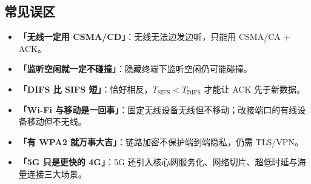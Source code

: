 \subsection{常见误区}

\begin{itemize}
    \item \textbf{「无线一定用 CSMA/CD」}：无线无法边发边听，只能用 CSMA/CA + ACK。
    \item \textbf{「监听空闲就一定不碰撞」}：隐藏终端下监听空闲仍可能碰撞。
    \item \textbf{「DIFS 比 SIFS 短」}：恰好相反，$T_{\text{SIFS}}<T_{\text{DIFS}}$ 才能让 ACK 先于新数据。
    \item \textbf{「Wi-Fi 与移动是一回事」}：固定无线设备无线但不移动；改接端口的有线设备移动但不无线。
    \item \textbf{「有 WPA2 就万事大吉」}：链路加密不保护端到端隐私，仍需 TLS/VPN。
    \item \textbf{「5G 只是更快的 4G」}：5G 还引入核心网服务化、网络切片、超低时延与海量连接三大场景。
\end{itemize}
